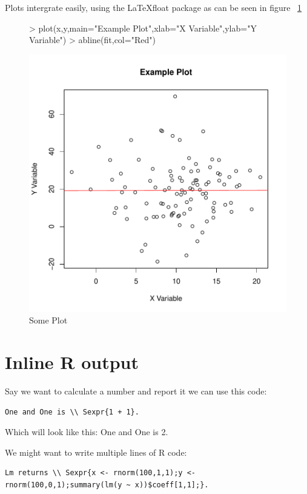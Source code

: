 \documentclass[a4paper]{report}
\begin{document}
Plots intergrate easily, using the \LaTeX float package as can be seen in figure ~\ref{test}
\begin{figure}[H]
\begin{center}
\begin{Schunk}
\begin{Sinput}
> plot(x,y,main="Example Plot",xlab="X Variable",ylab="Y Variable")
> abline(fit,col="Red")
\end{Sinput}
\end{Schunk}
\includegraphics{sexpr-003}
\end{center}
\caption{Some Plot}
\label{test}
\end{figure}
\clearpage




\section{Inline R output}
Say we want to calculate a number and report it we can use this code:

\begin{verbatim}
One and One is \\ Sexpr{1 + 1}.
\end{verbatim}
Which will look like this: One and One is 2.

We might want to write multiple lines of R code:
\begin{verbatim}
Lm returns \\ Sexpr{x <- rnorm(100,1,1);y <- rnorm(100,0,1);summary(lm(y ~ x))$coeff[1,1];}.
\end{verbatim}
\end{document}
